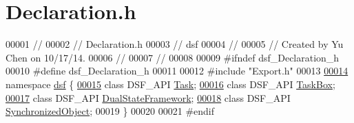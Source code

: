 \hypertarget{_declaration_8h_source}{}\section{Declaration.\+h}
\label{_declaration_8h_source}

\begin{DoxyCode}
00001 \textcolor{comment}{//}
00002 \textcolor{comment}{//  Declaration.h}
00003 \textcolor{comment}{//  dsf}
00004 \textcolor{comment}{//}
00005 \textcolor{comment}{//  Created by Yu Chen on 10/17/14.}
00006 \textcolor{comment}{//}
00007 \textcolor{comment}{//}
00008 
00009 \textcolor{preprocessor}{#ifndef dsf\_Declaration\_h}
00010 \textcolor{preprocessor}{#define dsf\_Declaration\_h}
00011 
00012 \textcolor{preprocessor}{#include "Export.h"}
00013 
\hypertarget{_declaration_8h_source_l00014}{}\hyperlink{namespacedsf}{00014} \textcolor{keyword}{namespace }\hyperlink{namespacedsf}{dsf} \{
\hypertarget{_declaration_8h_source_l00015}{}\hyperlink{namespacedsf_a7df24c7d3d82e2e686aa3a524dc1dee9}{00015}     \textcolor{keyword}{class }DSF\_API \hyperlink{classdsf_1_1_task}{Task};
\hypertarget{_declaration_8h_source_l00016}{}\hyperlink{namespacedsf_ac3c92e2a98380dd728b0c18d0c495966}{00016}     \textcolor{keyword}{class }DSF\_API \hyperlink{classdsf_1_1_task_box}{TaskBox};
\hypertarget{_declaration_8h_source_l00017}{}\hyperlink{namespacedsf_a68ac3b6a0526bfa7f6a412918afb1841}{00017}     \textcolor{keyword}{class }DSF\_API \hyperlink{classdsf_1_1_dual_state_framework}{DualStateFramework};
\hypertarget{_declaration_8h_source_l00018}{}\hyperlink{namespacedsf_acbf1798fc56cfb1707162a17e13f5fda}{00018}     \textcolor{keyword}{class }DSF\_API \hyperlink{classdsf_1_1_synchronized_object}{SynchronizedObject};
00019 \}
00020 
00021 \textcolor{preprocessor}{#endif}
\end{DoxyCode}
